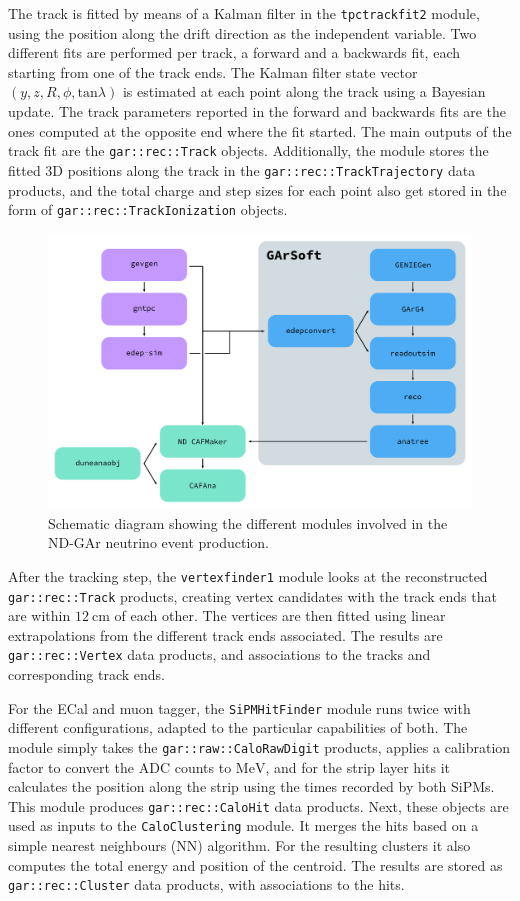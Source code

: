 The track is fitted by means of a Kalman filter in the \texttt{tpctrackfit2} module, using the position along the drift direction as the independent variable. Two different fits are performed per track, a forward and a backwards fit, each starting from one of the track ends. The Kalman filter state vector $(y,z,R,\phi,\mathrm{tan}\lambda)$ is estimated at each point along the track using a Bayesian update. The track parameters reported in the forward and backwards fits are the ones computed at the opposite end where the fit started. The main outputs of the track fit are the \texttt{gar::rec::Track} objects. Additionally, the module stores the fitted 3D positions along the track in the \texttt{gar::rec::TrackTrajectory} data products, and the total charge and step sizes for each point also get stored in the form of \texttt{gar::rec::TrackIonization} objects.

\begin{figure}[t]
	\centering
	\includegraphics[width=.90\linewidth]{Images/GArSoft_PID/gar_workflow.pdf}
	\caption{Schematic diagram showing the different modules involved in the ND-GAr neutrino event production.}
	\label{fig:gar_workflow}
\end{figure}

After the tracking step, the \texttt{vertexfinder1} module looks at the reconstructed \texttt{gar::rec::Track} products, creating vertex candidates with the track ends that are within $12~\mathrm{cm}$ of each other. The vertices are then fitted using linear extrapolations from the different track ends associated. The results are \texttt{gar::rec::Vertex} data products, and associations to the tracks and corresponding track ends.

For the ECal and muon tagger, the \texttt{SiPMHitFinder} module runs twice with different configurations, adapted to the particular capabilities of both. The module simply takes the \texttt{gar::raw::CaloRawDigit} products, applies a calibration factor to convert the ADC counts to $\mathrm{MeV}$, and for the strip layer hits it calculates the position along the strip using the times recorded by both SiPMs. This module produces \texttt{gar::rec::CaloHit} data products. Next, these objects are used as inputs to the \texttt{CaloClustering} module. It merges the hits based on a simple nearest neighbours (NN) algorithm. For the resulting clusters it also computes the total energy and position of the centroid. The results are stored as \texttt{gar::rec::Cluster} data products, with associations to the hits.

